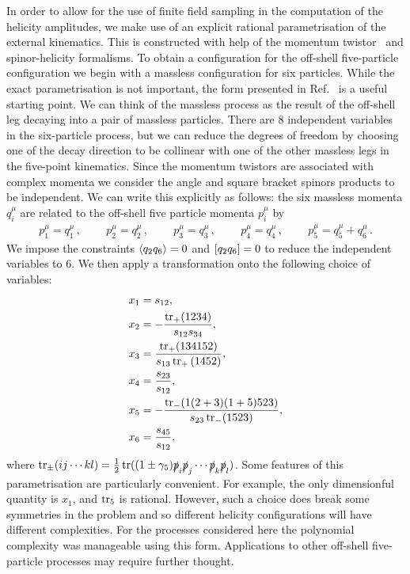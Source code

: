 \documentclass[main.tex]{subfiles}
\begin{document}
In order to allow for the use of finite field sampling in the computation of the helicity amplitudes, 
we make use of an explicit rational parametrisation of the external kinematics. 
This is constructed with help of the momentum twistor~\cite{Hodges:2009hk} and spinor-helicity formalisms. To obtain a configuration for the off-shell five-particle configuration we begin with a massless configuration
for six particles. While the exact parametrisation is not important, the form presented in
Ref.~\cite{Badger:2016uuq} is a useful starting point. We can think of the massless process as the result of the
off-shell leg decaying into a pair of massless particles. There are 8 independent variables in the six-particle
process, but we can reduce the degrees of freedom by choosing one of the decay direction to be
collinear with one of the other massless legs in the five-point kinematics. Since the momentum
twistors are associated with complex momenta we consider the angle and square bracket spinors
products to be independent. We can write this explicitly as follows: the six massless momenta $q_i^\mu$ are related to the off-shell five particle momenta $p_i^\mu$ by
\begin{align}
  p_1^\mu = q_1^\mu\,, \ \qquad 
  p_2^\mu = q_2^\mu\,, \ \qquad 
  p_3^\mu = q_3^\mu\,, \ \qquad
  p_4^\mu = q_4^\mu \,, \ \qquad
  p_5^\mu = q_5^\mu+q_6^\mu \,.
\end{align}
We impose the constraints $\langle q_2q_6\rangle = 0 $ and $[q_2q_6] = 0$ to reduce the independent variables to 6. 
We then apply a transformation onto the following choice of variables:
\begin{equation}
\begin{aligned}
  x_1 &= s_{12}, \\
  x_2 &= -\frac{\operatorname{\rm tr}_+(1234)}{s_{12}s_{34}}, \\
  x_3 &= \frac{\operatorname{\rm tr}_+(134152)}{s_{13}\operatorname{\rm tr}_+{(1452)}}, \\
  x_4 &= \frac{s_{23}}{s_{12}}, \\
  x_5 &= -\frac{\operatorname{\rm tr}_-(1(2+3)(1+5)523)}{s_{23}\operatorname{\rm tr}_-(1523)}, \\
  x_6 &= \frac{s_{45}}{s_{12}},
\end{aligned}
\label{eq:mtvardefs}
\end{equation}
where $\operatorname{\rm tr}_{\pm}(ij \cdots kl) = \frac{1}{2} \operatorname{\rm tr}((1\pm\gamma_5)\slashed{p}_i\slashed{p}_j \cdots\slashed{p}_k\slashed{p}_l)$.
Some features of this parametrisation are particularly convenient. For example, the only dimensionful 
quantity is $x_1$, and $\operatorname{\rm tr}_5$ is rational. However, such a choice does break some symmetries
in the problem and so different helicity configurations will have different complexities. For the
processes considered here the polynomial complexity was manageable using this form.
Applications to other off-shell five-particle processes may require further thought. 
\end{document}
